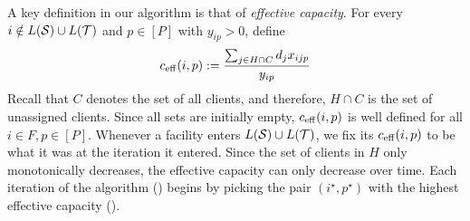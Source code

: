 A key definition in our algorithm is that of {\em effective capacity}. For every $i\notin L({\cal S})\cup L({\cal T})$ and $p\in [P]$ with $y_{ip} > 0$, define
\[
c_{\mathrm{eff}}(i,p) := \frac{\sum_{j\in H \cap C} d_j x_{ijp}}{y_{ip}}
\]
Recall that $C$ denotes the set of all clients, and therefore, $H \cap C$ is the set of unassigned clients.
Since all sets
 are initially empty, $c_{\mathrm{eff}}(i,p)$ is well defined for all $i\in F, p\in [P]$. Whenever a facility enters $L({\cal S})\cup L({\cal T})$, we fix its $c_{\mathrm{eff}}(i,p)$ to be what it was at the iteration it entered.
Since the set of clients in $H$ only monotonically decreases, the effective capacity can only decrease over time. Each iteration of the algorithm () begins by picking the pair $(i^\star, p^\star)$ with the highest
effective capacity (). %

